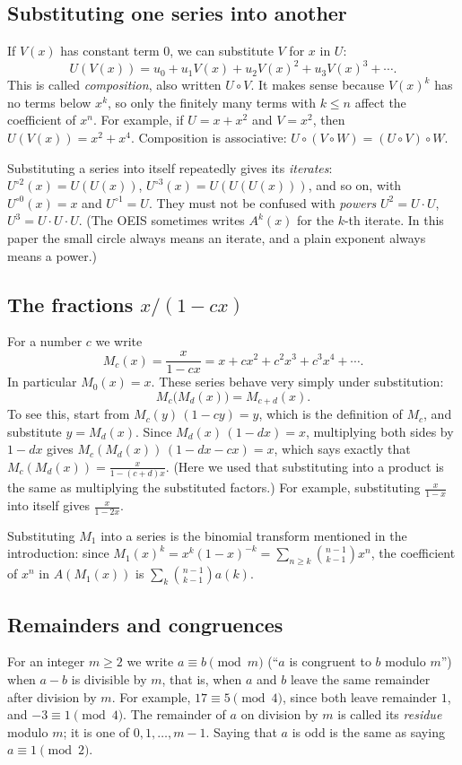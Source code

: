 \documentclass[11pt,a4paper]{article}
\theoremstyle{definition}
\theoremstyle{remark}
\begin{document}
\subsection{Substituting one series into another}
If $V(x)$ has constant term $0$, we can substitute $V$ for $x$ in $U$:
\[
U(V(x))=u_0+u_1V(x)+u_2V(x)^2+u_3V(x)^3+\cdots .
\]
This is called \emph{composition}, also written $U\circ V$. It makes sense because $V(x)^k$ has no terms below $x^k$,
so only the finitely many terms with $k\le n$ affect the coefficient of $x^n$. For example, if $U=x+x^2$ and $V=x^2$, then
$U(V(x))=x^2+x^4$. Composition is associative: $U\circ(V\circ W)=(U\circ V)\circ W$.

Substituting a series into itself repeatedly gives its \emph{iterates}: $U^{\circ2}(x)=U(U(x))$,
$U^{\circ3}(x)=U(U(U(x)))$, and so on, with $U^{\circ0}(x)=x$ and $U^{\circ1}=U$. They must not be confused with
\emph{powers} $U^2=U\cdot U$, $U^3=U\cdot U\cdot U$. (The OEIS sometimes writes $A^k(x)$ for the $k$-th iterate. In
this paper the small circle always means an iterate, and a plain exponent always means a power.)

\subsection{The fractions \texorpdfstring{$x/(1-cx)$}{x/(1-cx)}}
For a number $c$ we write
\[
M_c(x)=\frac{x}{1-cx}=x+cx^2+c^2x^3+c^3x^4+\cdots .
\]
In particular $M_0(x)=x$. These series behave very simply under substitution:
\begin{equation}\label{eq:mobius}
M_c\bigl(M_d(x)\bigr)=M_{c+d}(x).
\end{equation}
To see this, start from $M_c(y)\,(1-cy)=y$, which is the definition of $M_c$, and substitute $y=M_d(x)$. Since
$M_d(x)\,(1-dx)=x$, multiplying both sides by $1-dx$ gives $M_c(M_d(x))\,(1-dx-cx)=x$, which says exactly that
$M_c(M_d(x))=\frac{x}{1-(c+d)x}$. (Here we used that substituting into a product is the same as multiplying the
substituted factors.) For example, substituting $\frac{x}{1-x}$ into itself gives $\frac{x}{1-2x}$.

Substituting $M_1$ into a series is the binomial transform mentioned in the introduction: since
$M_1(x)^k=x^k(1-x)^{-k}=\sum_{n\ge k}\binom{n-1}{k-1}x^n$, the coefficient of $x^n$ in $A(M_1(x))$ is
$\sum_k\binom{n-1}{k-1}a(k)$.

\subsection{Remainders and congruences}
For an integer $m\ge2$ we write $a\equiv b\pmod m$ (``$a$ is congruent to $b$ modulo $m$'') when $a-b$ is divisible by
$m$, that is, when $a$ and $b$ leave the same remainder after division by $m$. For example, $17\equiv5\pmod 4$, since both leave remainder $1$, and $-3\equiv1\pmod4$. The
remainder of $a$ on division by $m$ is called its \emph{residue} modulo $m$; it is one of $0,1,\dots,m-1$. Saying that
$a$ is odd is the same as saying $a\equiv1\pmod2$.
\end{document}
